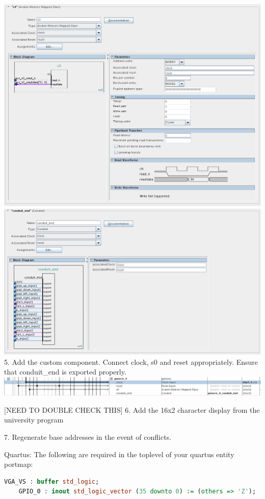 \documentclass{capstonedoc}
\begin{document}
\includegraphics{fig3}
\includegraphics{fig4}
5. Add the custom component. Connect clock, s0 and reset appropriately.
Ensure that conduit_end is exported properly.
\includegraphics{fig5}

[NEED TO DOUBLE CHECK THIS]
6. Add the 16x2 character display from the university program

7. Regenerate base addresses in the event of conflicts.


Quartus:
The following are required in the toplevel of your quartus entity portmap:

\begin{lstlisting}[language={vhdl},float]
	VGA_VS : buffer std_logic;
	GPIO_0 : inout std_logic_vector (35 downto 0) := (others => 'Z');
\end{lstlisting}
\end{document}
